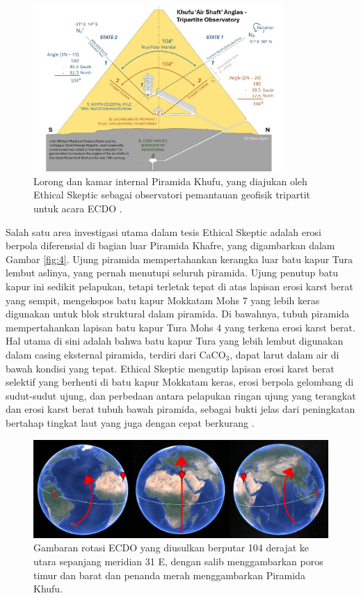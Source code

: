 \documentclass[10pt,twocolumn,letterpaper]{article}
\begin{document}
\begin{figure}[t]
\begin{center}
\includegraphics[width=0.85\textwidth]{shafts.jpg}
\end{center}
   \caption{Lorong dan kamar internal Piramida Khufu, yang diajukan oleh Ethical Skeptic sebagai observatori pemantauan geofisik tripartit untuk acara ECDO \cite{28}.}
\label{fig:5}
\end{figure}

Salah satu area investigasi utama dalam tesis Ethical Skeptic adalah erosi berpola diferensial di bagian luar Piramida Khafre, yang digambarkan dalam Gambar \ref{fig:4}. Ujung piramida mempertahankan kerangka luar batu kapur Tura lembut aslinya, yang pernah menutupi seluruh piramida. Ujung penutup batu kapur ini sedikit pelapukan, tetapi terletak tepat di atas lapisan erosi karst berat yang sempit, mengekspos batu kapur Mokkatam Mohs 7 yang lebih keras digunakan untuk blok struktural dalam piramida. Di bawahnya, tubuh piramida mempertahankan lapisan batu kapur Tura Mohs 4 yang terkena erosi karst berat. Hal utama di sini adalah bahwa batu kapur Tura yang lebih lembut digunakan dalam casing eksternal piramida, terdiri dari CaCO$_3$, dapat larut dalam air di bawah kondisi yang tepat. Ethical Skeptic mengutip lapisan erosi karst berat selektif yang berhenti di batu kapur Mokkatam keras, erosi berpola gelombang di sudut-sudut ujung, dan perbedaan antara pelapukan ringan ujung yang terangkat dan erosi karst berat tubuh bawah piramida, sebagai bukti jelas dari peningkatan bertahap tingkat laut yang juga dengan cepat berkurang \cite{27}.

\begin{figure}[b]
\begin{center}
\includegraphics[width=1\textwidth]{drawing.jpg}
\end{center}
   \caption{Gambaran rotasi ECDO yang diusulkan berputar 104 derajat ke utara sepanjang meridian 31 E, dengan salib menggambarkan poros timur dan barat dan penanda merah menggambarkan Piramida Khufu.}
\label{fig:6}
\end{figure}
\end{document}
